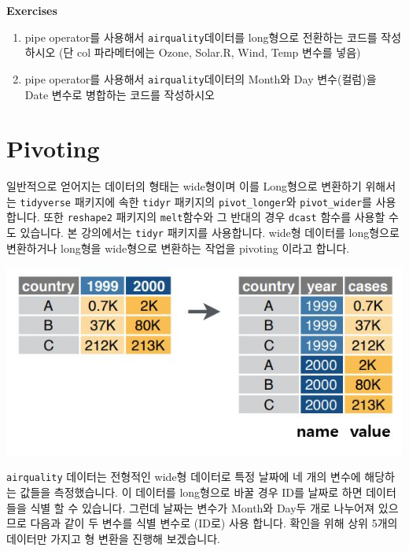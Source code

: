 \documentclass[
]{book}
\providecommand{\tightlist}{%
  \setlength{\itemsep}{0pt}\setlength{\parskip}{0pt}}
\begin{document}
\textbf{Exercises}

\begin{enumerate}
\def\labelenumi{\arabic{enumi})}
\tightlist
\item
  pipe operator를 사용해서 \texttt{airquality}데이터를 long형으로 전환하는 코드를 작성하시오 (단 col 파라메터에는 Ozone, Solar.R, Wind, Temp 변수를 넣음)\\
\item
  pipe operator를 사용해서 \texttt{airquality}데이터의 Month와 Day 변수(컬럼)을 Date 변수로 병합하는 코드를 작성하시오
\end{enumerate}

\hypertarget{pivoting}{%
\section{Pivoting}\label{pivoting}}

일반적으로 얻어지는 데이터의 형태는 wide형이며 이를 Long형으로 변환하기 위해서는 \texttt{tidyverse} 패키지에 속한 \texttt{tidyr} 패키지의 \texttt{pivot\_longer}와 \texttt{pivot\_wider}를 사용합니다. 또한 \texttt{reshape2} 패키지의 \texttt{melt}함수와 그 반대의 경우 \texttt{dcast} 함수를 사용할 수도 있습니다. 본 강의에서는 \texttt{tidyr} 패키지를 사용합니다. wide형 데이터를 long형으로 변환하거나 long형을 wide형으로 변환하는 작업을 pivoting 이라고 합니다.

\includegraphics{images/07/wide2long.JPG}

\texttt{airquality} 데이터는 전형적인 wide형 데이터로 특정 날짜에 네 개의 변수에 해당하는 값들을 측정했습니다. 이 데이터를 long형으로 바꿀 경우 ID를 날짜로 하면 데이터들을 식별 할 수 있습니다. 그런데 날짜는 변수가 Month와 Day두 개로 나누어져 있으므로 다음과 같이 두 변수를 식별 변수로 (ID로) 사용 합니다. 확인을 위해 상위 5개의 데이터만 가지고 형 변환을 진행해 보겠습니다.
\end{document}
